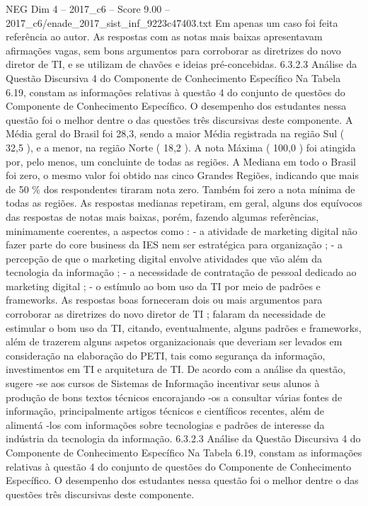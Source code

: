 \begin{textsample}{NEG Dim 4 – 2017\_c6 – Score 9.00 – 2017\_c6/enade\_2017\_sist\_inf\_9223c47403.txt}
Em apenas um caso foi feita referência ao autor.
As respostas com as notas mais baixas apresentavam afirmações vagas, sem bons argumentos para corroborar as diretrizes do novo diretor de TI, e se utilizam de chavões e ideias pré-concebidas. 6.3.2.3 Análise da Questão Discursiva 4 do Componente de Conhecimento Específico Na Tabela 6.19, constam as informações relativas à questão 4 do conjunto de questões do Componente de Conhecimento Específico.
O desempenho dos estudantes nessa questão foi o melhor dentre o das questões três discursivas deste componente.
A Média geral do Brasil foi 28,3, sendo a maior Média registrada na região Sul ( 32,5 ), e a menor, na região Norte ( 18,2 ).
A nota Máxima ( 100,0 ) foi atingida por, pelo menos, um concluinte de todas as regiões.
A Mediana em todo o Brasil foi zero, o mesmo valor foi obtido nas cinco Grandes Regiões, indicando que mais de 50 \% dos respondentes tiraram nota zero.
Também foi zero a nota mínima de todas as regiões.
As respostas medianas repetiram, em geral, alguns dos equívocos das respostas de notas mais baixas, porém, fazendo algumas referências, minimamente coerentes, a aspectos como : - a atividade de marketing digital não fazer parte do core business da IES nem ser estratégica para organização ; - a percepção de que o marketing digital envolve atividades que vão além da tecnologia da informação ; - a necessidade de contratação de pessoal dedicado ao marketing digital ; - o estímulo ao bom uso da TI por meio de padrões e frameworks.
As respostas boas forneceram dois ou mais argumentos para corroborar as diretrizes do novo diretor de TI ; falaram da necessidade de estimular o bom uso da TI, citando, eventualmente, alguns padrões e frameworks, além de trazerem alguns aspetos organizacionais que deveriam ser levados em consideração na elaboração do PETI, tais como segurança da informação, investimentos em TI e arquitetura de TI.
De acordo com a análise da questão, sugere -se aos cursos de Sistemas de Informação incentivar seus alunos à produção de bons textos técnicos encorajando -os a consultar várias fontes de informação, principalmente artigos técnicos e científicos recentes, além de alimentá -los com informações sobre tecnologias e padrões de interesse da indústria da tecnologia da informação. 6.3.2.3 Análise da Questão Discursiva 4 do Componente de Conhecimento Específico Na Tabela 6.19, constam as informações relativas à questão 4 do conjunto de questões do Componente de Conhecimento Específico.
O desempenho dos estudantes nessa questão foi o melhor dentre o das questões três discursivas deste componente.

\end{textsample}
